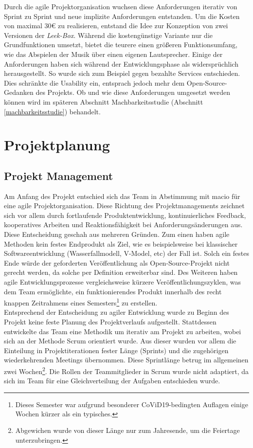 \documentclass[10pt, a4paper]{article}
\begin{document}
\begin{onehalfspace}
Durch die agile Projektorganisation wuchsen diese Anforderungen iterativ von Sprint zu Sprint und neue implizite Anforderungen entstanden.
Um die Kosten von maximal 30€ zu realisieren, entstand die Idee zur Konzeption von zwei Versionen der \textit{Leek-Box}. Während die kostengünstige Variante nur die Grundfunktionen umsetzt, bietet die teurere einen größeren Funktionsumfang, wie das Abspielen der Musik über einen eigenen Lautsprecher.
Einige der Anforderungen haben sich während der Entwicklungsphase als widersprüchlich herausgestellt.
So wurde sich zum Beispiel gegen bezahlte Services entschieden. Dies schränkte die Usability ein, entsprach jedoch mehr dem Open-Source-Gedanken des Projekts.
Ob und wie diese Anforderungen umgesetzt werden können wird im späteren Abschnitt Machbarkeitsstudie (Abschnitt \ref{machbarkeitsstudie}) behandelt.

\section{Projektplanung}
  \subsection{Projekt Management}
  Am Anfang des Projekt entschied sich das Team in Abstimmung mit macio für eine agile Projektorganisation.
  Diese Richtung des Projektmanagements zeichnet sich vor allem durch fortlaufende Produktentwicklung, kontinuierliches Feedback, kooperatives Arbeiten und
  Reaktionsfähigkeit bei Anforderungsänderungen aus. Diese Entscheidung geschah aus mehreren Gründen.
  Zum einen haben agile Methoden kein festes Endprodukt als Ziel, wie es beispielsweise bei klassischer Softwareentwicklung
  (Wasserfallmodell, V-Model, etc) der Fall ist. Solch ein festes Ende würde der geforderten Veröffentlichung als Open-Source-Projekt nicht gerecht werden,
  da solche per Definition erweiterbar sind. Des Weiteren haben agile Entwicklungsprozesse vergleichsweise kürzere Veröffentlichungszyklen,
  was dem Team ermöglichte, ein funktionierendes Produkt innerhalb des recht knappen Zeitrahmens eines
  Semesters\footnote{Dieses Semester war aufgrund besonderer CoViD19-bedingten Auflagen einige Wochen kürzer als ein typisches.} zu erstellen.
  \\
  Entsprechend der Entscheidung zu agiler Entwicklung wurde zu Beginn des Projekt keine feste Planung des Projektverlaufs aufgestellt.
  Stattdessen entwickelte das Team eine Methodik um iterativ am Projekt zu arbeiten, wobei sich an der Methode Scrum orientiert wurde.
  Aus dieser wurden vor allem die Einteilung in Projektiterationen fester Länge (Sprints) und die zugehörigen wiederkehrenden Meetings übernommen.
  Diese Sprintlänge betrug im allgemeinen zwei Wochen\footnote{Abgewichen wurde von dieser Länge nur zum Jahresende, um die Feiertage unterzubringen.}.
  Die Rollen der Teammitglieder in Scrum wurde nicht adaptiert, da sich im Team für eine Gleichverteilung der Aufgaben entschieden wurde.


\end{onehalfspace}
\end{document}

